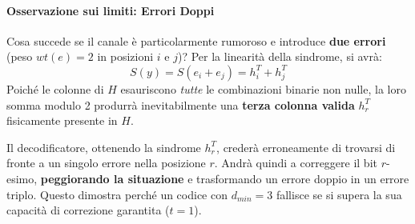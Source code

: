 \paragraph{Osservazione sui limiti: Errori Doppi}
Cosa succede se il canale è particolarmente rumoroso e introduce \textbf{due errori} (peso $wt(e)=2$ in posizioni $i$ e $j$)?
Per la linearità della sindrome, si avrà:
\[ S(y) = S(e_i + e_j) = h_i^T + h_j^T \]
Poiché le colonne di $H$ esauriscono \textit{tutte} le combinazioni binarie non nulle, la loro somma modulo 2 produrrà inevitabilmente una \textbf{terza colonna valida} $h_r^T$ fisicamente presente in $H$. 

Il decodificatore, ottenendo la sindrome $h_r^T$, crederà erroneamente di trovarsi di fronte a un singolo errore nella posizione $r$. Andrà quindi a correggere il bit $r$-esimo, \textbf{peggiorando la situazione} e trasformando un errore doppio in un errore triplo. 
Questo dimostra perché un codice con $d_{min}=3$ fallisce se si supera la sua capacità di correzione garantita ($t=1$).
